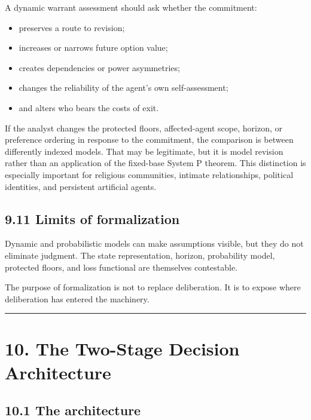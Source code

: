 \documentclass[
  11pt,
]{article}
\providecommand{\tightlist}{%
  \setlength{\itemsep}{0pt}\setlength{\parskip}{0pt}}
\begin{document}
A dynamic warrant assessment should ask whether the commitment:

\begin{itemize}
\tightlist
\item
  preserves a route to revision;
\item
  increases or narrows future option value;
\item
  creates dependencies or power asymmetries;
\item
  changes the reliability of the agent's own self-assessment;
\item
  and alters who bears the costs of exit.
\end{itemize}

If the analyst changes the protected floors, affected-agent scope,
horizon, or preference ordering in response to the commitment, the
comparison is between differently indexed models. That may be
legitimate, but it is model revision rather than an application of the
fixed-base System P theorem. This distinction is especially important
for religious communities, intimate relationships, political identities,
and persistent artificial agents.

\subsection{9.11 Limits of formalization}\label{limits-of-formalization}

Dynamic and probabilistic models can make assumptions visible, but they
do not eliminate judgment. The state representation, horizon,
probability model, protected floors, and loss functional are themselves
contestable.

The purpose of formalization is not to replace deliberation. It is to
expose where deliberation has entered the machinery.

\begin{center}\rule{0.5\linewidth}{0.5pt}\end{center}

\section{10. The Two-Stage Decision
Architecture}\label{the-two-stage-decision-architecture}

\subsection{10.1 The architecture}\label{the-architecture}
\end{document}
